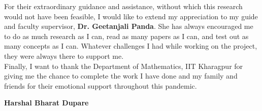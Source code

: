 % 
\begin{acknowledgements}

For their extraordinary guidance and assistance, without which this research would not have been feasible, I would like to extend my appreciation to my guide and faculty supervisor, \textbf{Dr. Geetanjali Panda}. She has always encouraged me to do as much research as I can, read as many papers as I can, and test out as many concepts as I can. Whatever challenges I had while working on the project, they were always there to support me.\\

Finally, I want to thank the Department of Mathematics, IIT Kharagpur for giving me the chance to complete the work I have done and my family and friends for their emotional support throughout this pandemic.
\\[1cm]
\begin{flushright}
\textbf{Harshal Bharat Dupare}
\end{flushright}

\end{acknowledgements}